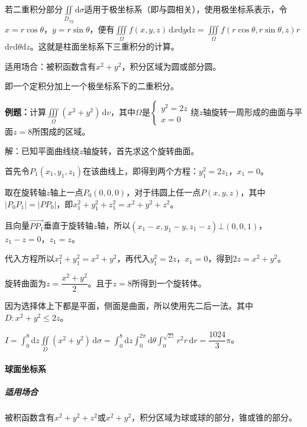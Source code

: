 若二重积分部分$\iint\limits_{D_{xy}}\textrm{d}\sigma$适用于极坐标系（即与圆相关），使用极坐标系表示，令$x=r\cos\theta$，$y=r\sin\theta$，便有$\iiint\limits_\Omega f(x,y,z)\,\textrm{d}x\textrm{d}y\textrm{d}z=\iiint\limits_\Omega f(r\cos\theta,r\sin\theta,z)r\,$\\$\textrm{d}r\textrm{d}\theta\textrm{d}z$。这就是柱面坐标系下三重积分的计算。

适用场合：被积函数含有$x^2+y^2$，积分区域为圆或部分圆。

即一个定积分加上一个极坐标系下的二重积分。


\textbf{例题：}计算$\iiint\limits_\Omega(x^2+y^2)\,\textrm{d}v$，其中$\Omega$是$\left\{\begin{array}{ll}
    y^2=2z \\
    x=0
\end{array}\right.$绕$z$轴旋转一周形成的曲面与平面$z=8$所围成的区域。

解：已知平面曲线绕$z$轴旋转，首先求这个旋转曲面。

首先令$P_1(x_1,y_1,z_1)$在该曲线上，即得到两个方程：$y_1^2=2z_1$，$x_1=0$。

取在旋转轴$z$轴上一点$P_0(0,0,0)$，对于纬圆上任一点$P(x,y,z)$，其中$\vert P_0P_1\vert=\vert PP_0\vert$，即$x_1^2+y_1^2+z_1^2=x^2+y^2+z^2$。

且向量$\overrightarrow{PP_1}$垂直于旋转轴$z$轴，所以$(x_1-x,y_1-y,z_1-z)\bot(0,0,1)$，$z_1-z=0$，$z_1=z$。

代入方程所以$x_1^2+y_1^2=x^2+y^2$，再代入$y_1^2=2z$，$x_1=0$，得到$2z=x^2+y^2$。

旋转曲面为$z=\dfrac{x^2+y^2}{2}$。且于$z=8$所得到一个旋转体。

因为选择体上下都是平面，侧面是曲面，所以使用先二后一法。其中$D:x^2+y^2\leqslant2z$。

$I=\int_0^8\textrm{d}z\iint\limits_D(x^2+y^2)\,\textrm{d}\sigma=\int_0^8\textrm{d}z\int_0^{2\pi}\textrm{d}\theta\int_0^{\sqrt{2z}}r^2r\,\textrm{d}r=\dfrac{1024}{3}\pi$。

\paragraph{球面坐标系} \leavevmode \medskip

\subparagraph{适用场合} \leavevmode \medskip

被积函数含有$x^2+y^2+z^2$或$x^2+y^2$，积分区域为球或球的部分，锥或锥的部分。

